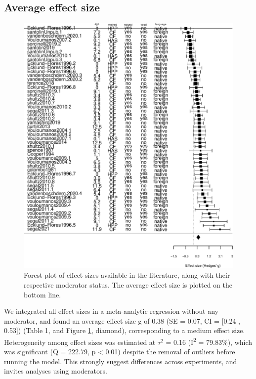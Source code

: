 \documentclass[
  english,
  man]{apa6}
\begin{document}
\hypertarget{average-effect-size}{%
\subsection{Average effect size}\label{average-effect-size}}

\begin{figure}
\centering
\includegraphics{MA_speech_pref_files/figure-latex/forest-1.pdf}
\caption{\label{fig:forest}Forest plot of effect sizes available in the literature, along with their respective moderator status. The average effect size is plotted on the bottom line.}
\end{figure}

We integrated all effect sizes in a meta-analytic regression without any moderator, and found an average effect size g of 0.38 (SE = 0.07, CI = {[}0.24 , 0.53{]}) (Table 1, and Figure \ref{fig:forest}, diamond), corresponding to a medium effect size.
Heterogeneity among effect sizes was estimated at \(\tau^2\) = 0.16 (I\textsuperscript{2} = 79.83\%), which was significant (Q = 222.79, p \textless{} 0.01) despite the removal of outliers before running the model. This strongly suggest differences across experiments, and invites analyses using moderators.
\end{document}
